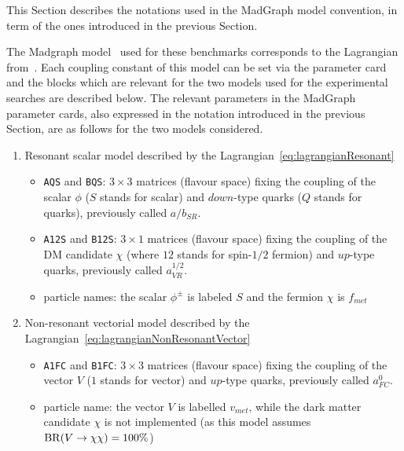 % 



This Section describes the notations used in the MadGraph model convention, 
in term of the ones introduced in the previous Section.

The Madgraph model~\cite{MGmodel} used for these benchmarks corresponds to the Lagrangian from~\cite{AndreaFuksMaltoni}. 
Each coupling constant of this model can be set via the parameter card and 
the blocks which are relevant for the two models used for the experimental searches are described below.
The relevant parameters in the MadGraph parameter cards, also expressed in the notation introduced in the 
previous Section, are as follows for the two models considered.

\begin{enumerate}

\item Resonant scalar model described by the Lagrangian~\eqref{eq:lagrangianResonant}
  \begin{itemize}
  \item \texttt{AQS} and \texttt{BQS}: $3\times 3$ matrices (flavour space) fixing the coupling of the scalar $\phi$ ($S$ stands for scalar) and $down$-type quarks ($Q$ stands for quarks), previously called $a/b_{SR}$.
  \item \texttt{A12S} and \texttt{B12S}: $3\times 1$ matrices (flavour space) fixing the coupling of the DM candidate $\chi$ (where $12$ stands for spin-$1/2$ fermion) and $up$-type quarks, previously called $a^{1/2}_{VR}$.
  \item particle names: the scalar $\phi^{\pm}$ is labeled $S$ and the fermion $\chi$ is $f_{met}$
  \end{itemize}  
  
\item Non-resonant vectorial model described by the Lagrangian~\eqref{eq:lagrangianNonResonantVector}
\begin{itemize}
\item \texttt{A1FC} and \texttt{B1FC}: $3\times 3$ matrices (flavour space) fixing the coupling of the vector $V$ ($1$ stands for vector) and $up$-type quarks, previously called $a^0_{FC}$. 
\item particle name: the vector $V$ is labelled $v_{met}$, while the dark matter candidate $\chi$ is not implemented (as this model assumes $\mathrm{BR}({V} \to {\chi\chi})=100\%$)
\end{itemize}

\end{enumerate}

